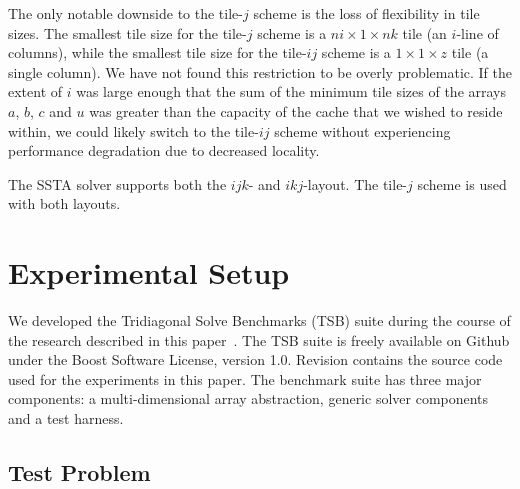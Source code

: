 \documentclass{sig-alternate-05-2015}
\begin{document}

The only notable downside to the tile-\(j\) scheme is the loss of
  flexibility in tile sizes.
The smallest tile size for the tile-\(j\) scheme is a \(ni \times 1 \times nk\)
  tile (an \(i\)-line of columns), while the smallest tile size for the
  tile-\(ij\) scheme is a \(1 \times 1 \times z\) tile (a single column).
We have not found this restriction to be overly problematic.
If the extent of \(i\) was large enough that the sum of the minimum tile sizes of
  the arrays \(a\), \(b\), \(c\) and \(u\) was greater than the capacity of the
  cache that we wished to reside within, we could likely switch to the tile-\(ij\)
  scheme without experiencing performance degradation due to decreased locality.

The SSTA solver supports both the \(ijk\)- and \(ikj\)-layout.
The tile-\(j\) scheme is used with both layouts.

\section{Experimental Setup}
\label{sec:experimental_setup:}
We developed the Tridiagonal Solve Benchmarks (TSB) suite during the course of
  the research described in this paper~\cite{tsb_git}.
The TSB suite is freely available on Github under the Boost Software License,
  version 1.0.
Revision  contains the source code used for the experiments in
  this paper.
The benchmark suite has three major components: a multi-dimensional array
  abstraction, generic solver components and a test harness.

\subsection{Test Problem}
\label{sec:experimental_setup:test_problem}
\end{document}
